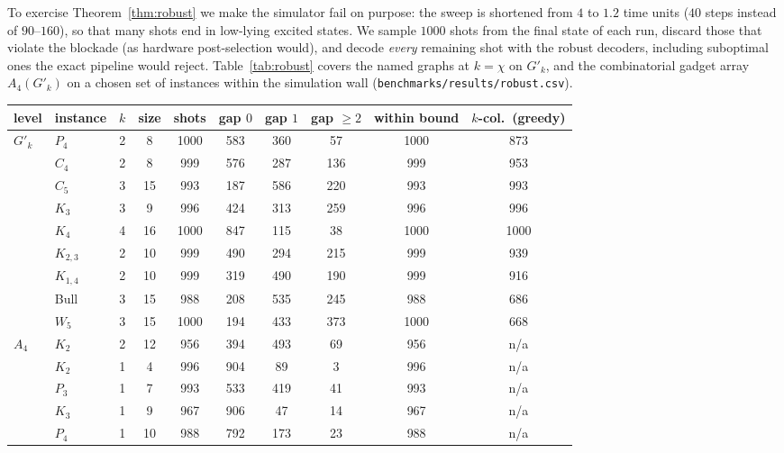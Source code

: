 \documentclass[a4paper,fleqn]{cas-sc}
\begin{document}
To exercise Theorem~\ref{thm:robust} we make the simulator fail on purpose: the sweep
is shortened from $4$ to $1.2$ time units ($40$ steps instead of $90$--$160$), so that
many shots end in low-lying excited states. We sample $1000$ shots from the final
state of each run, discard those that violate the blockade (as hardware post-selection
would), and decode \emph{every} remaining shot with the robust decoders, including
suboptimal ones the exact pipeline would reject. Table~\ref{tab:robust} covers the
named graphs at $k=\chi$ on $G'_k$, and the combinatorial gadget array $A_4(G'_k)$ on
a chosen set of instances within the simulation wall
(\texttt{benchmarks/results/robust.csv}).

\begin{table}[tb]
\centering
\small
\setlength{\tabcolsep}{4.5pt}
\begin{tabular}{@{}llcccccccc@{}}
\toprule
level & instance & $k$ & size & shots & gap $0$ & gap $1$ & gap $\ge2$ & within bound & $k$-col.\ (greedy) \\
\midrule
$G'_k$ & $P_4$          & 2 & 8  & 1000 & 583 & 360 & 57  & 1000 & 873 \\
       & $C_4$          & 2 & 8  & 999  & 576 & 287 & 136 & 999  & 953 \\
       & $C_5$          & 3 & 15 & 993  & 187 & 586 & 220 & 993  & 993 \\
       & $K_3$          & 3 & 9  & 996  & 424 & 313 & 259 & 996  & 996 \\
       & $K_4$          & 4 & 16 & 1000 & 847 & 115 & 38  & 1000 & 1000 \\
       & $K_{2,3}$      & 2 & 10 & 999  & 490 & 294 & 215 & 999  & 939 \\
       & $K_{1,4}$      & 2 & 10 & 999  & 319 & 490 & 190 & 999  & 916 \\
       & Bull           & 3 & 15 & 988  & 208 & 535 & 245 & 988  & 686 \\
       & $W_5$          & 3 & 15 & 1000 & 194 & 433 & 373 & 1000 & 668 \\
\midrule
$A_4$  & $K_2$          & 2 & 12 & 956  & 394 & 493 & 69  & 956  & n/a \\
       & $K_2$          & 1 & 4  & 996  & 904 & 89  & 3   & 996  & n/a \\
       & $P_3$          & 1 & 7  & 993  & 533 & 419 & 41  & 993  & n/a \\
       & $K_3$          & 1 & 9  & 967  & 906 & 47  & 14  & 967  & n/a \\
       & $P_4$          & 1 & 10 & 988  & 792 & 173 & 23  & 988  & n/a \\

\end{tabular}
\end{table}
\end{document}
